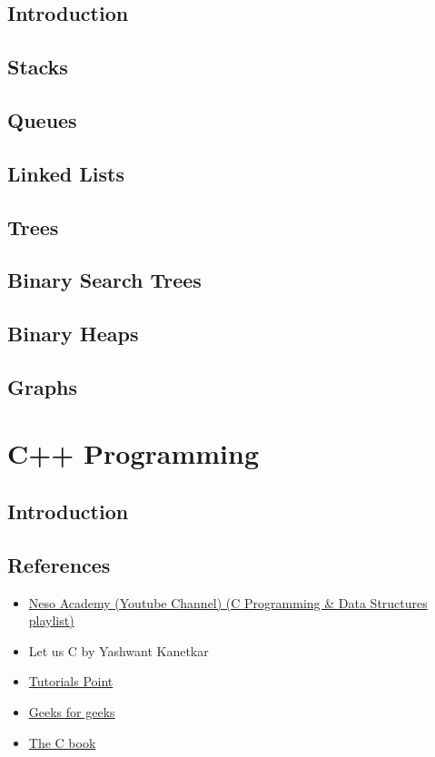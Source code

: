 \documentclass[12pt, a4paper]{report}
\begin{document}
    \section{Introduction}
    \section{Stacks}
    \section{Queues}
    \section{Linked Lists}
    \section{Trees}
    \section{Binary Search Trees}
    \section{Binary Heaps}
    \section{Graphs}

	\fi

    
    \chapter{C++ Programming}
     
    \section{Introduction}
    
    \clearpage  


    \section{References}

	\begin{itemize} 
        \item \href{https://youtube.com/playlist?list=PLBlnK6fEyqRhX6r2uhhlubuF5QextdCSM}{Neso Academy (Youtube Channel) (C Programming \& Data Structures playlist)}
        \item Let us C by Yashwant Kanetkar    
        \item \href{https://www.tutorialspoint.com/cprogramming/index.htm}{Tutorials Point}
        \item \href{https://www.geeksforgeeks.org/c-programming-language/}{Geeks for geeks}
        \item \href{https://publications.gbdirect.co.uk/c_book/}{The C book}
	\end{itemize}
	
\end{document}
